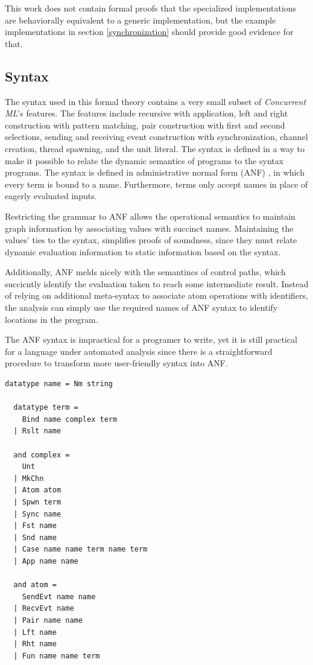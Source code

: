 \documentclass[letterpaper, 11pt]{extarticle}
\begin{document}
This work does not contain formal proofs that the specialized implementations are
behaviorally equivalent to a generic implementation, but the example implementations in 
section \ref{synchronization} should provide good evidence for that.

\subsection{Syntax}
The syntax used in this formal theory contains a very small subset of
\textit{Concurrent ML}'s features. The features include recursive  with
application, left and right construction with pattern matching, pair construction with first
and second selections, sending and receiving event construction with synchronization,
channel creation, thread spawning, and the unit literal. The syntax is defined in a way to
make it possible to relate the dynamic semantics of programs to the syntax programs.
The syntax is defined in administrative normal form (ANF) \cite{flanagan1993essence}, in which every term
is bound to a name. Furthermore, terms only accept names in place of eagerly evaluated
inputs. 

Restricting the grammar to ANF allows the operational semantics
to maintain graph information by associating values with succinct names.
Maintaining the values' ties to the syntax,
simplifies proofs of soundness, since they must relate dynamic evaluation information
to static information based on the syntax.

Additionally, ANF melds nicely with the semantincs of control paths, which succicntly identify
the evaluation taken to reach some intermediate result.
Instead of relying on additional meta-syntax to associate atom operations with identifiers,
the analysis can simply use the required names of ANF syntax to identify locations in the program.

The ANF syntax is impractical for a programer to write,
yet it is still practical for a language under automated analysis
since there is a straightforward procedure to transform
more user-friendly syntax into ANF.

\begin{lstlisting}[language=logic]
  datatype name = Nm string

  datatype term = 
    Bind name complex term 
  | Rslt name

  and complex = 
    Unt
  | MkChn
  | Atom atom
  | Spwn term 
  | Sync name
  | Fst name
  | Snd name
  | Case name name term name term 
  | App name name

  and atom = 
    SendEvt name name
  | RecvEvt name
  | Pair name name
  | Lft name
  | Rht name
  | Fun name name term 
\end{lstlisting}
\end{document}
